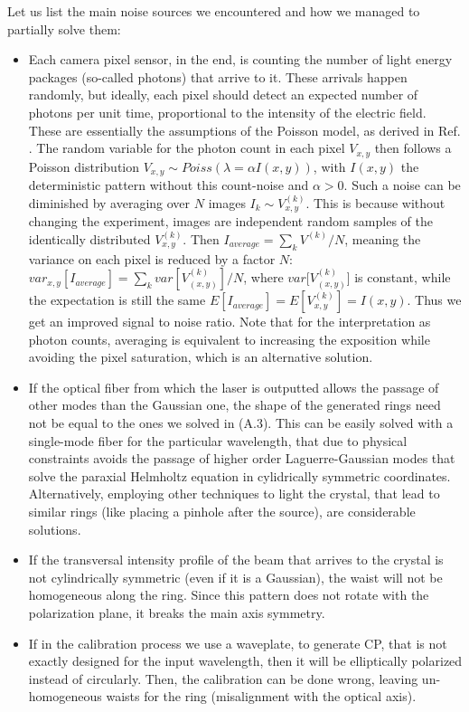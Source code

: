 \documentclass[11pt, a4paper, twoside]{article} %
\begin{document}
Let us list the main noise sources we encountered and how we managed to partially solve them:\vspace{-0.25cm}
\begin{itemize}
\item Each camera pixel sensor, in the end, is counting the number of light energy packages (so-called photons) that arrive to it. These arrivals happen randomly, but ideally, each pixel should detect an expected number of photons per unit time, proportional to the intensity of the electric field. These are essentially the assumptions of the Poisson model, as derived in Ref. \cite{poisson}. The random variable for the photon count in each pixel $V_{x,y}$ then follows a Poisson distribution $V_{x,y}\sim Poiss(\lambda=\alpha I(x,y))$, with $I(x,y)$ the deterministic pattern without this count-noise and $\alpha>0$. Such a noise can be diminished by averaging over $N$ images $I_k\sim V^{(k)}_{x,y}$. This is because without changing the experiment, images are independent random samples of the identically distributed $V^{(k)}_{x,y}$. Then $I_{average}=\sum_{k}V^{(k)}/N$, meaning the variance on each pixel is reduced by a factor $N$: $var_{x,y}[I_{average}]=\sum_k var[V_{(x,y)}^{(k)}]/N$, where $var[V_{(x,y)}^{(k)}$] is constant, while the expectation is still the same $E[I_{average}]=E[V_{x,y}^{(k)}]=I(x,y)$. Thus we get an improved signal to noise ratio. Note that for the interpretation as photon counts, averaging is equivalent to increasing the exposition while avoiding the pixel saturation, which is an alternative solution.

\item If the optical fiber from which the laser is outputted allows the passage of other modes than the Gaussian one, the shape of the generated rings need not be equal to the ones we solved in (A.3). This can be easily solved with a single-mode fiber for the particular wavelength, that due to physical constraints avoids the passage of higher order Laguerre-Gaussian modes that solve the paraxial Helmholtz equation in cylidrically symmetric coordinates. Alternatively, employing other techniques to light the crystal, that lead to similar rings (like placing a pinhole after the source), are considerable solutions. \vspace{-0.1cm}

\item If the transversal intensity profile of the beam that arrives to the crystal is not cylindrically symmetric (even if it is a Gaussian), the waist will not be homogeneous along the ring. Since this pattern does not rotate with the polarization plane, it breaks the main axis symmetry.
\item If in the calibration process we use a waveplate, to generate CP, that is not exactly designed for the input wavelength, then it will be elliptically polarized instead of circularly. Then, the calibration can be done wrong, leaving un-homogeneous waists for the ring (misalignment with the optical axis).


\end{itemize}
\end{document}
